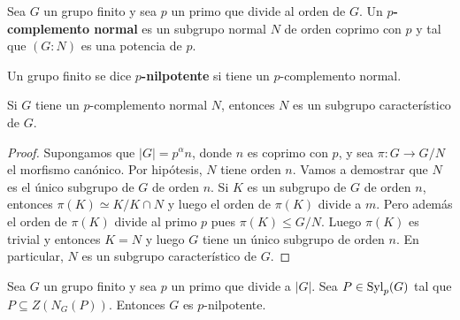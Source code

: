\begin{definition}
	Sea $G$ un grupo finito y sea $p$ un primo que divide al orden de $G$. Un
	\textbf{$p$-complemento normal} es un subgrupo normal $N$ de orden coprimo
	con $p$ y tal que $(G:N)$ es una potencia de $p$.
\end{definition}

\begin{definition}
	Un grupo finito se dice \textbf{$p$-nilpotente} si tiene un $p$-complemento
	normal. 
\end{definition}

\begin{proposition}
	Si $G$ tiene un $p$-complemento normal $N$, entonces $N$ es un subgrupo
	característico de $G$.
\end{proposition}

\begin{proof}
	Supongamos que $|G|=p^\alpha n$, donde $n$ es coprimo con $p$, y sea
	$\pi\colon G\to G/N$ el morfismo canónico.  Por hipótesis, $N$ tiene orden
	$n$. Vamos a demostrar que $N$ es el único subgrupo de $G$ de orden $n$. Si
	$K$ es un subgrupo de $G$ de orden $n$, entonces  $\pi(K)\simeq K/K\cap N$
	y luego el orden de $\pi(K)$ divide a $m$. Pero además el orden de $\pi(K)$
	divide al primo $p$ pues $\pi(K)\leq G/N$. Luego $\pi(K)$ es trivial y
	entonces $K=N$ y luego $G$ tiene un único subgrupo de orden $n$. En
	particular, $N$ es un subgrupo característico de $G$.
\end{proof}



\begin{theorem}[Burnside]
	\label{theorem:Burnside:normal_complement}
	Sea $G$ un grupo finito y sea $p$ un primo que divide a $|G|$. Sea
	$P\in\mathrm{Syl}_p(G)$ tal que $P\subseteq Z(N_G(P))$. Entonces $G$ es
	$p$-nilpotente.
\end{theorem}

